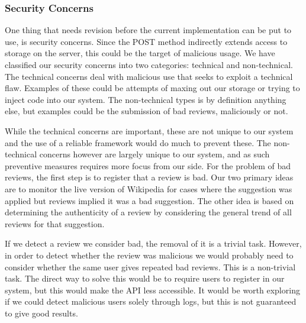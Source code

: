 \subsubsection{Security Concerns}

One thing that needs revision before the current implementation can be put to use, is security concerns. Since the POST method indirectly extends access to storage on the server, this could be the target of malicious usage. We have classified our security concerns into two categories: technical and non-technical. The technical concerns deal with malicious use that seeks to exploit a technical flaw. Examples of these could be attempts of maxing out our storage or trying to inject code into our system. The non-technical types is by definition anything else, but examples could be the submission of bad reviews, maliciously or not.

While the technical concerns are important, these are not unique to our system and the use of a reliable framework would do much to prevent these. The non-technical concerns however are largely unique to our system, and as such preventive measures requires more focus from our side. For the problem of bad reviews, the first step is to register that a review is bad. Our two primary ideas are to monitor the live version of Wikipedia for cases where the suggestion was applied but reviews implied it was a bad suggestion. The other idea is based on determining the authenticity of a review by considering the general trend of all reviews for that suggestion.

If we detect a review we consider bad, the removal of it is a trivial task. However, in order to detect whether the review was malicious we would probably need to consider whether the same user gives repeated bad reviews. This is a non-trivial task. The direct way to solve this would be to require users to register in our system, but this would make the API less accessible. It would be worth exploring if we could detect malicious users solely through logs, but this is not guaranteed to give good results.
